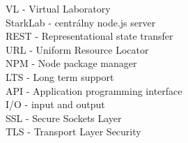 VL - Virtual Laboratory \\
StarkLab - centrálny node.js server\\
REST - Representational state transfer\\
URL - Uniform Resource Locator\\
NPM - Node package manager\\
LTS - Long term support\\
API - Application programming interface\\
I/O - input and output\\
SSL - Secure Sockets Layer\\
TLS - Transport Layer Security\\


